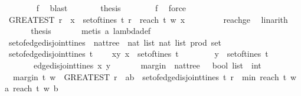 \begin{isabellebody}
\ \ \ \ \ \ \isamarkupfalse%
\ f{}\ \isamarkupfalse%
\ blast\isanewline
\ \ \ \ \isamarkupfalse%
\ \isamarkupfalse%
\ {\isacharquery}thesis\isanewline
\ \ \ \ \ \ \isamarkupfalse%
\ f{}\ \isamarkupfalse%
\ force\isanewline
\ \ \isamarkupfalse%
\isanewline
\ \ \ \isamarkupfalse%
\ \isamarkupfalse%
\ {\isachardoublequoteopen}{\isacharparenleft}GREATEST\ r{\isachardot}\ {\isasymexists}\ x\ {\isasymin}\ set{\isacharunderscore}of{\isacharunderscore}tines\ t{\isachardot}\ r\ {\isacharequal}\ reach\ t\ w\ x{\isacharparenright}\ {\isasymge}\ {}{\isachardoublequoteclose}\isanewline
\ \ \ \ \ \isamarkupfalse%
\ reachge{}\ \isamarkupfalse%
\ linarith\ \isanewline
\ \ \ \isamarkupfalse%
\ \isamarkupfalse%
\ {\isacharquery}thesis\isanewline
\ \ \ \ \ \isamarkupfalse%
\ {\isacharparenleft}metis\ a\ lambda{\isacharunderscore}def{\isacharparenright}\isanewline
\ \isamarkupfalse%
%
\endisatagproof
{\isafoldproof}%
%
\isadelimproof
\isanewline
%
\endisadelimproof
\ \ \ \isanewline
{}\isamarkupfalse%
\ set{\isacharunderscore}of{\isacharunderscore}edge{\isacharunderscore}disjoint{\isacharunderscore}tines\ {\isacharcolon}{\isacharcolon}\ {\isachardoublequoteopen}nattree\ {\isasymRightarrow}\ {\isacharparenleft}{\isacharparenleft}nat\ list{\isacharcomma}\ nat\ list{\isacharparenright}\ prod{\isacharparenright}\ set{\isachardoublequoteclose}\ \isanewline
\ {\isachardoublequoteopen}set{\isacharunderscore}of{\isacharunderscore}edge{\isacharunderscore}disjoint{\isacharunderscore}tines\ t\isanewline
\ \ \ {\isacharequal}\ {\isacharbraceleft}{\isacharparenleft}x{\isacharcomma}y{\isacharparenright}{\isachardot}\ x\ {\isasymin}\ set{\isacharunderscore}of{\isacharunderscore}tines\ t\ \isanewline
\ \ \ \ \ \ {\isasymand}\ y\ {\isasymin}\ set{\isacharunderscore}of{\isacharunderscore}tines\ t\isanewline
\ \ \ \ \ \ {\isasymand}\ edge{\isacharunderscore}disjoint{\isacharunderscore}tines\ x\ y{\isacharbraceright}{\isachardoublequoteclose}\ \isanewline
\ \ \ \ \isanewline
{}\isamarkupfalse%
\ margin\ {\isacharcolon}{\isacharcolon}\ {\isachardoublequoteopen}nattree\ {\isasymRightarrow}\ \ bool\ list\ {\isasymRightarrow}\ int{\isachardoublequoteclose}\ \isanewline
\ \ {\isachardoublequoteopen}margin\ t\ w\ {\isacharequal}\ {\isacharparenleft}GREATEST\ r{\isachardot}\ {\isacharparenleft}{\isasymexists}\ {\isacharparenleft}a{\isacharcomma}b{\isacharparenright}\ {\isasymin}\ set{\isacharunderscore}of{\isacharunderscore}edge{\isacharunderscore}disjoint{\isacharunderscore}tines\ t{\isachardot}\ r\ {\isacharequal}\ min\ {\isacharparenleft}reach\ t\ w\ a{\isacharparenright}\ {\isacharparenleft}reach\ t\ w\ b{\isacharparenright}{\isacharparenright}{\isacharparenright}{\isachardoublequoteclose}\isanewline

\end{isabellebody}
